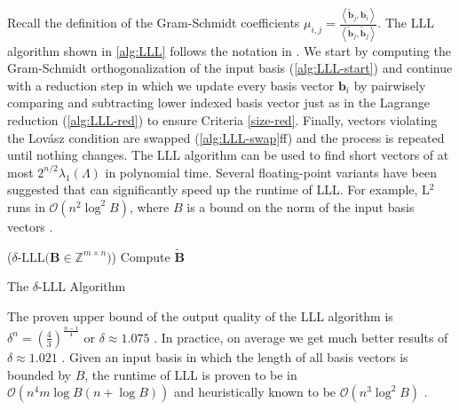 Recall the definition of the Gram-Schmidt coefficients $\mu_{i, j} = \frac{\left\langle \tilde{\mathbf{b}}_j, \mathbf{b}_i\right\rangle}{\left\langle \tilde{\mathbf{b}}_j, \tilde{\mathbf{b}}_j\right\rangle}$. The LLL algorithm shown in \cref{alg:LLL} follows the notation in \cite{LLLReg04}. We start by computing the Gram-Schmidt orthogonalization of the input basis (\cref{alg:LLL-start}) and continue with a reduction step in which we update every basis vector $\mathbf{b}_i$ by pairwisely comparing and subtracting lower indexed basis vector just as in the Lagrange reduction (\cref{alg:LLL-red}) to ensure Criteria \ref{size-red}. Finally, vectors violating the Lovász condition are swapped (\cref{alg:LLL-swap}ff) and the process is repeated until nothing changes. The LLL algorithm can be used to find short vectors of at most $2^{n/2} \lambda_1(\Lambda)$ in polynomial time. Several floating-point variants have been suggested that can significantly speed up the runtime of LLL. For example, L$^2$ runs in $\mathcal{O}(n^2 \log^2 B)$, where $B$ is a bound on the norm of the input basis vectors \cite{NS05}. %

\begin{algorithm2e}
  \Begin($\delta\text{-LLL} {(}\mathbf{B} \in \mathbb{Z}^{m\times n} {)}$) %
  {
    Compute $\tilde{\mathbf{B}}$\label{alg:LLL-start}\\
  }
  \caption{The $\delta$-LLL Algorithm \cite{LLL82}} \label{alg:LLL}
\end{algorithm2e}


The proven upper bound of the output quality of the LLL algorithm is $\delta^n = \left(\frac{4}{3}\right)^{\frac{n-1}{4}}$ or $\delta \approx 1.075$ \cite{LLL82}. In practice, on average we get much better results of $\delta \approx 1.021$ \cite{Chen13}. Given an input basis in which the length of all basis vectors is bounded by $B$, the runtime of LLL is proven to be in $\mathcal{O}\left(n^4m\log B(n+\log B)\right)$ \cite{NS05} and heuristically known to be $\mathcal{O}\left(n^{3}\log^2 B\right)$ \cite{APS15}.



